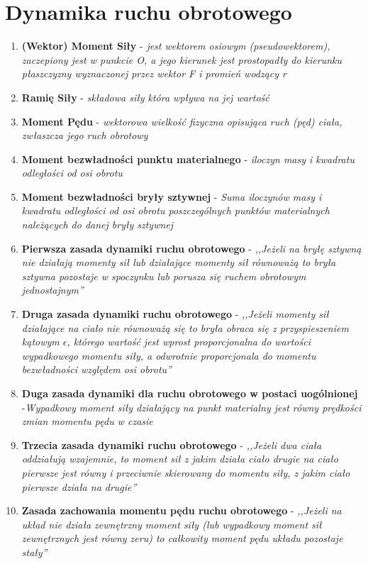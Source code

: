 \documentclass[12pt,twoside,a4paper]{book}
\begin{document}
\section{Dynamika ruchu obrotowego}
\begin{enumerate}[label=(\alph*)]
\item\textbf{(Wektor) Moment Siły} - \textit{jest wektorem osiowym (pseudowektorem), zaczepiony jest w punkcie O, a jego kierunek jest prostopadły do kierunku płaszczyzny wyznaczonej przez wektor F i promień wodzący r}
\item\textbf{Ramię Siły} - \textit{składowa siły która wpływa na jej wartość}
\item\textbf{Moment Pędu} - \textit{wektorowa wielkość fizyczna opisująca ruch (pęd) ciała, zwłaszcza jego ruch obrotowy}
\item\textbf{Moment bezwładności punktu materialnego} - \textit{iloczyn masy i kwadratu odległości od osi obrotu}
\item\textbf{Moment bezwładności bryły sztywnej} - \textit{Suma iloczynów masy i kwadratu odległości od osi obrotu poszczególnych punktów materialnych należących do danej bryły sztywnej}
\item\textbf{Pierwsza zasada dynamiki ruchu obrotowego} - \textit{,,Jeżeli na bryłę sztywną nie działają momenty sił lub działające momenty sił równoważą to bryła sztywna pozostaje w spoczynku lub porusza się ruchem obrotowym jednostajnym''}
\item\textbf{Druga zasada dynamiki ruchu obrotowego} - \textit{,,Jeżeli momenty sił działające na ciało nie równoważą się to bryła obraca się z przyspieszeniem kątowym $\epsilon$, którego wartość jest wprost proporcjonalna do wartości wypadkowego momentu siły, a odwrotnie proporcjonala do momentu bezwładności względem osi obrotu''}
\item\textbf{Duga zasada dynamiki dla ruchu obrotowego w postaci uogólnionej} -\textit{Wypadkowy moment siły działający na punkt materialny jest równy prędkości zmian momentu pędu w czasie }
\item\textbf{Trzecia zasada dynamiki ruchu obrotowego} - \textit{,,Jeżeli dwa ciała oddziałują wzajemnie, to moment sił z jakim działa ciało drugie na ciało pierwsze jest równy i przeciwnie skierowany do momentu siły, z jakim ciało pierwsze działa na drugie''}
\item\textbf{Zasada zachowania momentu pędu ruchu obrotowego} - \textit{,,Jeżeli na układ nie działa zewnętrzny moment siły (lub wypadkowy moment sił zewnętrznych jest równy zeru) to całkowity moment pędu układu pozostaje stały''}
\end{enumerate}
\end{document}
